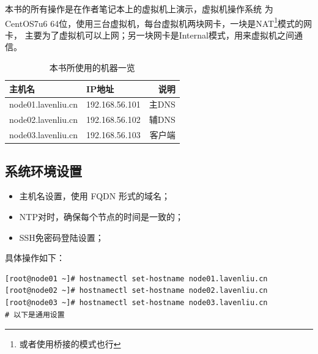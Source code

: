 本书的所有操作是在作者笔记本上的虚拟机上演示，虚拟机操作系统
为CentOS7u6 64位，使用三台虚拟机，每台虚拟机两块网卡，一块是NAT\footnote{或者使用桥接的模式也行}模式的网卡，
主要为了虚拟机可以上网；另一块网卡是Internal模式，用来虚拟机之间通信。

\begin{table}[htbp]
  \centering
    \caption{本书所使用的机器一览}
    \label{tab:allMachines}
    \begin{tabular}{llr}
      \toprule
      主机名     & IP地址 & 说明 \\
      \midrule
      node01.lavenliu.cn  & 192.168.56.101 &  主DNS \\
      node02.lavenliu.cn  & 192.168.56.102 &  辅DNS \\
      node03.lavenliu.cn  & 192.168.56.103 &  客户端 \\
      \bottomrule
    \end{tabular}
\end{table}

\subsection{系统环境设置}
\label{sec:osSetup}

\begin{itemize}
  \item 主机名设置，使用 FQDN 形式的域名；
  \item NTP对时，确保每个节点的时间是一致的；
  \item SSH免密码登陆设置；
\end{itemize}

具体操作如下：

\begin{verbatim}
[root@node01 ~]# hostnamectl set-hostname node01.lavenliu.cn
[root@node02 ~]# hostnamectl set-hostname node02.lavenliu.cn
[root@node03 ~]# hostnamectl set-hostname node03.lavenliu.cn
# 以下是通用设置
\end{verbatim}